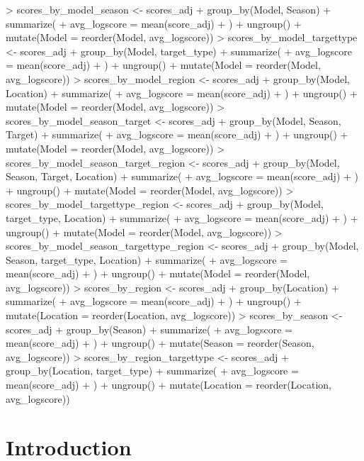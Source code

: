 \documentclass{article}
\begin{document}
\begin{Schunk}
\begin{Sinput}
> scores_by_model_season <- scores_adj %
+     group_by(Model, Season) %
+     summarize(
+         avg_logscore = mean(score_adj)
+     ) %
+     ungroup() %
+     mutate(Model = reorder(Model, avg_logscore))
> scores_by_model_targettype <- scores_adj %
+     group_by(Model, target_type) %
+     summarize(
+         avg_logscore = mean(score_adj)
+     ) %
+     ungroup() %
+     mutate(Model = reorder(Model, avg_logscore))
> scores_by_model_region <- scores_adj %
+     group_by(Model, Location) %
+     summarize(
+         avg_logscore = mean(score_adj)
+     ) %
+     ungroup() %
+     mutate(Model = reorder(Model, avg_logscore))
> scores_by_model_season_target <- scores_adj %
+     group_by(Model, Season, Target) %
+     summarize(
+         avg_logscore = mean(score_adj)
+     ) %
+     ungroup() %
+     mutate(Model = reorder(Model, avg_logscore))
> scores_by_model_season_target_region <- scores_adj %
+     group_by(Model, Season, Target, Location) %
+     summarize(
+         avg_logscore = mean(score_adj)
+     ) %
+     ungroup() %
+     mutate(Model = reorder(Model, avg_logscore))
> scores_by_model_targettype_region <- scores_adj %
+     group_by(Model, target_type, Location) %
+     summarize(
+         avg_logscore = mean(score_adj)
+     ) %
+     ungroup() %
+     mutate(Model = reorder(Model, avg_logscore))
> scores_by_model_season_targettype_region <- scores_adj %
+     group_by(Model, Season, target_type, Location) %
+     summarize(
+         avg_logscore = mean(score_adj)
+     ) %
+     ungroup() %
+     mutate(Model = reorder(Model, avg_logscore))
> scores_by_region <- scores_adj %
+     group_by(Location) %
+     summarize(
+         avg_logscore = mean(score_adj)
+     ) %
+     ungroup() %
+     mutate(Location = reorder(Location, avg_logscore))
> scores_by_season <- scores_adj %
+     group_by(Season) %
+     summarize(
+         avg_logscore = mean(score_adj)
+     ) %
+     ungroup() %
+     mutate(Season = reorder(Season, avg_logscore))
> scores_by_region_targettype <- scores_adj %
+     group_by(Location, target_type) %
+     summarize(
+         avg_logscore = mean(score_adj)
+     ) %
+     ungroup() %
+     mutate(Location = reorder(Location, avg_logscore))
\end{Sinput}
\end{Schunk}



\section{Introduction}
\end{document}
